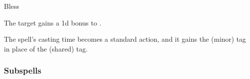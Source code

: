 \newpage
\begin{spellsection}{Bless}

\begin{spellheader}
\end{spellheader}

\begin{spellcontent}

\begin{spelltargetinginfo}



\end{spelltargetinginfo}


\begin{spelleffects}



\spelleffect
The target gains a \plus1d bonus to .








\end{spelleffects}

\end{spellcontent}
\begin{spellfooter}


\end{spellfooter}
\begin{spellsubcontent}


\begin{spellcantrip}
The spell's casting time becomes a standard action, and it gains the  (minor) tag in place of the  (shared) tag.
\end{spellcantrip}


\end{spellsubcontent}
\end{spellsection}


\subsubsection{Subspells}





